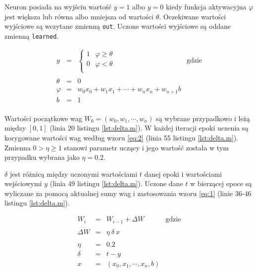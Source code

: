 \documentclass[pointlessnumbers, abstracton, headsepline, a4paper]{scrartcl}
\begin{document}
Neuron posiada na wyjściu wartość $y=1$ albo $y=0$ kiedy funkcja aktywacyjna $\varphi$ jest większa lub równa albo mniejsza od wartości $\theta$. Oczekiwane wartości wyjściowe są wczytane zmienną \texttt{out}. Uczone wartości wyjściowe są oddane zmienną \texttt{learned}.

\begin{equation}
\label{eq:1}
\begin{array}{rcll}
y & = & \left\{
    \begin{array}{lc}
        1 & \varphi \ge \theta \\
        0 & \varphi < \theta \\
    \end{array}
\right. & \textrm{gdzie} \\
\\
\theta & = & 0 \\
\varphi & = & w_0 x_0 + w_1 x_1 + \cdots + w_n x_n + w_{n+1} b \\
b & = & 1 \\
\end{array}
\end{equation}

Wartości początkowe wag $W_0 = (w_0, w_1, \cdots , w_n)$ są wybrane przypadkowo i leżą między $[0,1]$ (linia 20 listingu \ref{lst:delta.m}). W każdej iteracji epoki uczenia są korygowane wartości wag według wzoru \ref{eq:2} (linia 55 listingu \ref{lst:delta.m}). Zmienna $0 > \eta \ge 1$ stanowi parametr uczący i jego wartość została w tym przypadku wybrana jako $\eta = 0.2$.

$\delta$ jest różnicą między uczonymi wartościami $t$ danej epoki i wartościami wejściowymi $y$ (linia 49 listingu \ref{lst:delta.m}). Uczone dane $t$ w bierzącej epoce są wyliczane za pomocą aktualnej sumy wag i zastosowania wzoru \ref{eq:1} (linie 36-46 listingu \ref{lst:delta.m}).

\begin{equation}
\label{eq:2}
\begin{array}{rcll}
W_{i} & = & W_{i-1} + \Delta W & \textrm{gdzie} \\
\\
\Delta W & = & \eta \ \delta \ x \\
\\
\eta & = & 0.2 \\
\delta & = & t-y \\
x & = & (x_0, x_1, \cdots, x_n, b)
\end{array}
\end{equation}
\end{document}
